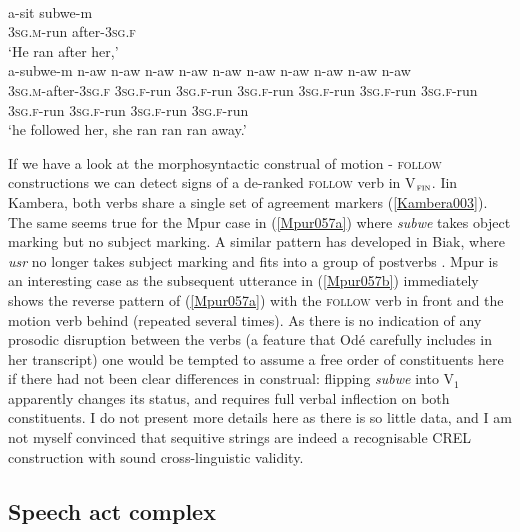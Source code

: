 \ea 
{}\\
\ea \label{Mpur057a}
\gll a-sit subwe-m \\
\textsc{3}\textsc{sg}.\textsc{m}-run after-\textsc{3}\textsc{sg}.\textsc{f} \\
\glft `He ran after her,' \\ 
\ex \label{Mpur057b}
\gll a-subwe-m n-aw n-aw n-aw n-aw n-aw n-aw n-aw n-aw n-aw n-aw \\
\textsc{3}\textsc{sg}.\textsc{m}-after-\textsc{3}\textsc{sg}.\textsc{f} \textsc{3}\textsc{sg}.\textsc{f}-run \textsc{3}\textsc{sg}.\textsc{f}-run \textsc{3}\textsc{sg}.\textsc{f}-run \textsc{3}\textsc{sg}.\textsc{f}-run \textsc{3}\textsc{sg}.\textsc{f}-run \textsc{3}\textsc{sg}.\textsc{f}-run \textsc{3}\textsc{sg}.\textsc{f}-run \textsc{3}\textsc{sg}.\textsc{f}-run \textsc{3}\textsc{sg}.\textsc{f}-run \textsc{3}\textsc{sg}.\textsc{f}-run\\
\glft `he followed her, she ran ran ran away.'\\ 
\z
\z

If we have a look at the morphosyntactic construal of motion - \textsc{follow} constructions we can detect signs of a de-ranked \textsc{follow} verb in V$_{\textsc{fin}}$. Iin Kambera, both verbs share a single set of agreement markers (\ref{Kambera003}). The same seems true for the Mpur case in (\ref{Mpur057a}) where \textit{subwe} takes object marking but no subject marking. A similar pattern has developed in Biak, where \textit{usr} no longer takes subject marking and fits into a group of postverbs \citep[183, and pp. 187--91]{vanheuvel2006}. Mpur is an interesting case as the subsequent utterance in (\ref{Mpur057b}) immediately shows the reverse pattern of (\ref{Mpur057a}) with the \textsc{follow} verb in front and the motion verb behind (repeated several times). As there is no indication of any prosodic disruption between the verbs (a feature that Odé carefully includes in her transcript) one would be tempted to assume a free order of constituents here if there had not been clear differences in construal: flipping \textit{subwe} into V$_{1}$ apparently changes its status, and requires full verbal inflection on both constituents. I do not present more details here as there is so little data, and I am not myself convinced that sequitive strings are indeed a recognisable CREL construction with sound cross-linguistic validity.

\subsection{Speech act complex} \label{sec:speechactcomplex}

